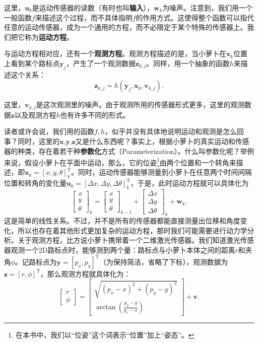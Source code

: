 这里，$\bm{u}_k$是运动传感器的读数（有时也叫\textbf{输入}），$\bm{w}_k$为噪声。注意到，我们用一个一般函数$f$来描述这个过程，而不具体指明$f$的作用方式。这使得整个函数可以指代任意的运动传感器，成为一个通用的方程，而不必限定于某个特殊的传感器上。我们把它称为\textbf{运动方程}。

与运动方程相对应，还有一个\textbf{观测方程}。观测方程描述的是，当小萝卜在$\bm{x}_k$位置上看到某个路标点$\bm{y}_j$，产生了一个观测数据$\bm{z}_{k,j}$。同样，用一个抽象的函数$h$来描述这个关系：
\begin{equation}
{\bm{z}_{k,j}} = h\left( {{\bm{y}_j},{\bm{x}_k}, \bm{v}_{k,j} } \right).
\end{equation}

这里，$\bm{v}_{k,j}$是这次观测里的噪声。由于观测所用的传感器形式更多，这里的观测数据$\bm{z}$以及观测方程$h$也有许多不同的形式。

读者或许会说，我们用的函数$f,h$，似乎并没有具体地说明运动和观测是怎么回事？同时，这里的$\bm{x}$,$\bm{y}$,$\bm{z}$又是什么东西呢？事实上，根据小萝卜的真实运动和传感器的种类，存在着若干种\textbf{参数化}方式（Parameterization）。什么叫参数化呢？举例来说，假设小萝卜在平面中运动，那么，它的位姿\footnote{在本书中，我们以“位姿”这个词表示“位置”加上“姿态”。}由两个位置和一个转角来描述，即$\bm{x}_k = [x,y,\theta]_k^\mathrm{T}$。同时，运动传感器能够测量到小萝卜在任意两个时间间隔位置和转角的变化量$\bm{u}_k = [ \Delta x, \Delta y, \Delta \theta ]_k^\mathrm{T} $，于是，此时运动方程就可以具体化为
\begin{equation}
{\left[ \begin{array}{l}
	x\\
	y\\
	\theta
	\end{array} \right]_k} = {\left[ \begin{array}{l}
	x\\
	y\\
	\theta
	\end{array} \right]_{k - 1}} + {\left[ \begin{array}{l}
	\Delta x\\
	\Delta y\\
	\Delta \theta
	\end{array} \right]_k} + {\bm{w}_k}.
\end{equation}
这是简单的线性关系。不过，并不是所有的传感器都能直接测量出位移和角度变化，所以也存在着其他形式更加复杂的运动方程，那时我们可能需要进行动力学分析。关于观测方程，比方说小萝卜携带着一个二维激光传感器。我们知道激光传感器观测一个2D路标点时，能够测到两个量：路标点与小萝卜本体之间的距离$r$和夹角$\phi$。记路标点为$\bm{y} = [p_x, p_y]^\mathrm{T}$（为保持简洁，省略了下标），观测数据为$\bm{z} = [r, \phi ]^\mathrm{T}$，那么观测方程就具体化为：
\begin{equation}
\left[ \begin{array}{l}
r\\
\phi
\end{array} \right] = \left[ \begin{array}{l}
\sqrt {{{\left( {{p_x} - x} \right)}^2} + {{\left( {{p_y} - y} \right)}^2}} \\
\arctan \left( \frac{{{p_y} - y}}{{{p_x} - x}} \right)
\end{array} \right] + \bm{v}.
\end{equation}

